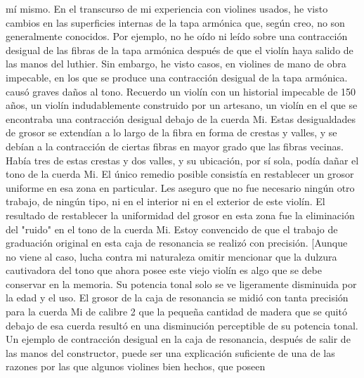 mí mismo.
En el transcurso de mi experiencia con violines usados, he visto cambios en las superficies internas de la tapa armónica que, según creo, no son generalmente conocidos. Por ejemplo, no he oído ni leído sobre una contracción desigual de las fibras de la tapa armónica después de que el violín haya salido de las manos del luthier. Sin embargo, he visto casos, en violines de mano de obra impecable, en los que se produce una contracción desigual de la tapa armónica.
causó graves daños al tono. Recuerdo un violín con un historial impecable de 150 años, un violín indudablemente construido por un artesano, un violín en el que se encontraba una contracción desigual debajo de la cuerda Mi. Estas desigualdades de grosor se extendían a lo largo de la fibra en forma de crestas y valles, y se debían a la contracción de ciertas fibras en mayor grado que las fibras vecinas. Había tres de estas crestas y dos valles, y su ubicación, por sí sola, podía dañar el tono de la cuerda Mi. El único remedio posible consistía en restablecer un grosor uniforme en esa zona en particular. Les aseguro que no fue necesario ningún otro trabajo, de ningún tipo, ni en el interior ni en el exterior de este violín. El resultado de restablecer la uniformidad del grosor en esta zona fue la eliminación del "ruido" en el tono de la cuerda Mi. Estoy convencido de que el trabajo de graduación original en esta caja de resonancia se realizó con precisión.
[Aunque no viene al caso, lucha contra mi naturaleza omitir mencionar que la dulzura cautivadora del tono que ahora posee este viejo violín es algo que se debe conservar en la memoria. Su potencia tonal solo se ve ligeramente disminuida por la edad y el uso. El grosor de la caja de resonancia se midió con tanta precisión para la cuerda Mi de calibre 2 que la pequeña cantidad de madera que se quitó debajo de esa cuerda resultó en una disminución perceptible de su potencia tonal. Un ejemplo de contracción desigual en la caja de resonancia, después de salir de las manos del constructor, puede ser una explicación suficiente de una de las razones por las que algunos violines bien hechos, que poseen

